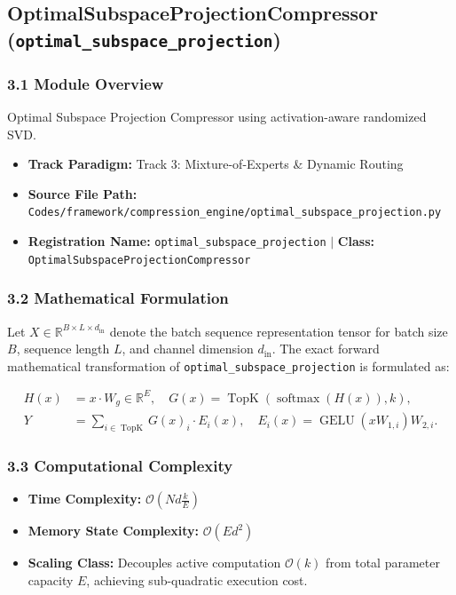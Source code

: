 \subsection{OptimalSubspaceProjectionCompressor (\texttt{optimal\_subspace\_projection})}
\label{sec:app_module_optimal_subspace_projection}

\subsubsection*{3.1 Module Overview}
Optimal Subspace Projection Compressor using activation-aware randomized SVD.
\begin{itemize}
    \item \textbf{Track Paradigm:} Track 3: Mixture-of-Experts & Dynamic Routing
    \item \textbf{Source File Path:} \texttt{Codes/framework/compression\_engine/optimal\_subspace\_projection.py}
    \item \textbf{Registration Name:} \texttt{optimal\_subspace\_projection} $\mid$ \textbf{Class:} \texttt{OptimalSubspaceProjectionCompressor}
\end{itemize}

\subsubsection*{3.2 Mathematical Formulation}
Let $X \in \mathbb{R}^{B \times L \times d_{\text{in}}}$ denote the batch sequence representation tensor for batch size $B$, sequence length $L$, and channel dimension $d_{\text{in}}$. The exact forward mathematical transformation of \texttt{optimal\_subspace\_projection} is formulated as:

\begin{align}
H(x) &= x \cdot W_g \in \mathbb{R}^{E}, \quad G(x) = \operatorname{TopK}\left(\operatorname{softmax}(H(x)), k\right), \\
Y &= \sum_{i \in \operatorname{TopK}} G(x)_i \cdot E_i(x), \quad E_i(x) = \operatorname{GELU}(x W_{1, i}) W_{2, i}.
\end{align}


\subsubsection*{3.3 Computational Complexity}
\begin{itemize}
    \item \textbf{Time Complexity:} $\mathcal{O}(N d \frac{k}{E})$
    \item \textbf{Memory State Complexity:} $\mathcal{O}(E d^2)$
    \item \textbf{Scaling Class:} Decouples active computation $\mathcal{O}(k)$ from total parameter capacity $E$, achieving sub-quadratic execution cost.
\end{itemize}


